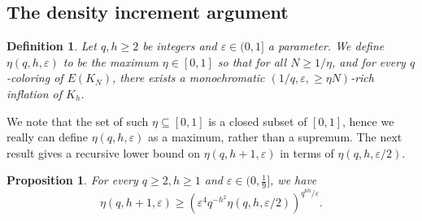 \documentclass{aic}
\theoremstyle{plain}
\newtheorem{proposition}[theorem]{Proposition}
\newtheorem{definition}[theorem]{Definition}
\theoremstyle{remark}
\newcommand{\eps}{\ensuremath{\varepsilon}}
\begin{document}
\subsection{The density increment argument}
\begin{definition}
    Let $q,h \geq 2$ be integers and $\eps \in (0,1]$ a parameter. We define
    $\eta(q,h,\eps)$ to be the maximum $\eta \in [0,1]$ so that for all $N\geq 1/\eta$, and for every $q$-coloring of $E(K_N)$, there exists a monochromatic $(1/q,\eps,\ge \eta N)$-rich inflation of $K_h$.
\end{definition}
We note that the set of such $\eta \subseteq [0,1]$ is a closed subset of $[0,1]$, hence we really can define $\eta(q,h,\eps)$ as a maximum, rather than a supremum. The next result gives a recursive lower bound on $\eta(q,h+1,\eps)$ in terms of $\eta(q,h,\eps/2)$.
\begin{proposition}\label{prop:main increment}
    For every $q\geq 2,h \geq 1$ and $\eps \in (0,\frac 19]$, we have
    \[
    \eta(q,h+1,\eps) \geq \left(\eps^4 q^{-h^2} \eta(q,h,\eps/2)\right)^{q^{6h}/\eps}.
    \]
\end{proposition}
\end{document}
